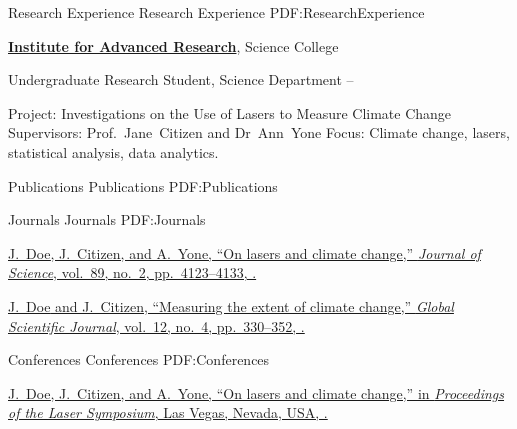 \documentclass[letterpaper,MMMyyyy,nonstopmode]{simpleresumecv}
\begin{document}
\begin{Body}

  \Section
  {Research Experience}
  {Research Experience}
  {PDF:ResearchExperience}

  \Entry
  \href{http://www.example.com/my-institute}
  {\textbf{Institute for Advanced Research}},
  Science College

  \Gap
    \BulletItem
    Undergraduate Research Student, Science Department
    \hfill
     --
    \begin{Detail}
      \SubBulletItem
        Project:
        Investigations on the Use of Lasers to Measure Climate Change
      \SubBulletItem
        Supervisors:
        Prof.~Jane~Citizen and
        Dr~Ann~Yone
      \SubBulletItem
        Focus:
        Climate change, lasers, statistical analysis, data analytics.
    \end{Detail}


  \Section
  {Publications}
  {Publications}
  {PDF:Publications}

  \SubSection
  {Journals}
  {Journals}
  {PDF:Journals}

  \begingroup
  \renewcommand{\MaxNumberedItem}{[88]}

  \BigGap
    \NumberedItem{[10]}
    \href{http://www.example.com/my-paper-doi-5}
    {\underline{J.~Doe}, J.~Citizen, and A.~Yone,
    ``On lasers and climate change,''
    \textit{Journal of Science},
    vol.~89,
    no.~2,
    pp.~4123--4133,
    .}

  \Gap
    \NumberedItem{[1]}
    \href{http://www.example.com/my-paper-doi-4}
    {\underline{J.~Doe} and J.~Citizen,
    ``Measuring the extent of climate change,''
    \textit{Global Scientific Journal},
    vol.~12,
    no.~4,
    pp.~330--352,
    .}

  \endgroup

  \BigGap
  \SubSection
  {Conferences}
  {Conferences}
  {PDF:Conferences}

  \begingroup
  \renewcommand{\MaxNumberedItem}{[8888]}

  \BigGap
    \NumberedItem{[1000]}
    \href{http://www.example.com/my-paper-doi-3}
    {\underline{J.~Doe}, J.~Citizen, and A.~Yone,
    ``On lasers and climate change,''
    in \textit{Proceedings of the Laser Symposium},
    Las Vegas, Nevada, USA,
    .}


\end{Body}
\end{document}

